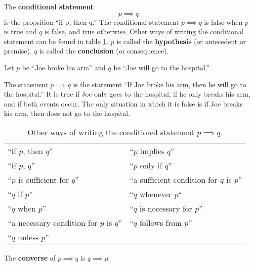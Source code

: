   The \textbf{conditional statement} \[p \implies q\] is the propsition ``if p, then q.''
  The conditional statement \(p \implies q\) is false when \(p\) is true and \(q\) is false, and true otherwise.
  Other ways of writing the conditional statement can be found in table \ref{tab:conditionals}.
  \(p\) is called the \textbf{hypothesis} (or antecedent or premise).
  \(q\) is called the \textbf{conclusion} (or consequence).
  \begin{ex}
    Let $p$ be ``Joe broke his arm'' and $q$ be ``Joe will go to the hospital.''

    The statement $p \implies q$ is the statement ``If Joe broke his arm, then he will go to the hospital.''
    It is true if Joe only goes to the hospital, if he only breaks his arm, and if both events occur.
    The only situation in which it is false is if Joe breaks his arm, then does not go to the hospital.
  \end{ex}
  \begin{table}[H]
  \centering
    \begin{tabular}{p{2in} p{2in}}
      ``if \(p\), then \(q\)'' & ``\(p\) implies \(q\)'' \\
      ``if \(p\), \(q\)'' & ``\(p\) only if \(q\)'' \\
      ``\(p\) is sufficient for \(q\)'' & ``a sufficient condition for \(q\) is \(p\)'' \\
      ``\(q\) if \(p\)'' & ``\(q\) whenever \(p\)`` \\
      ``\(q\) when \(p\)'' & ``\(q\) is necessary for \(p\)'' \\
      ``a necessary condition for \(p\) is \(q\)'' & ``\(q\) follows from \(p\)'' \\
      ``\(q\) unless \(p\)''
    \end{tabular}
  \caption{Other ways of writing the conditional statement \(p \implies q\).}
  \label{tab:conditionals}
\end{table}
  The \textbf{converse} of \(p \implies q\) is \(q \implies p\).

